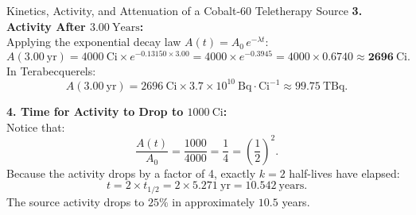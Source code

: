 \begin{workedexample}{Kinetics, Activity, and Attenuation of a Cobalt-60 Teletherapy Source}
\textbf{3. Activity After $3.00\ \mathrm{Years}$:}\\
Applying the exponential decay law $A(t) = A_0\,e^{-\lambda t}$:
\[
A(3.00\ \mathrm{yr}) = 4000\ \mathrm{Ci} \times e^{-0.13150 \times 3.00} = 4000 \times e^{-0.3945} = 4000 \times 0.6740 \approx \mathbf{2696\ \mathrm{Ci}}.
\]
In Terabecquerels:
\[
A(3.00\ \mathrm{yr}) = 2696\ \mathrm{Ci} \times 3.7 \times 10^{10}\ \mathrm{Bq\cdot Ci^{-1}} \approx \mathbf{99.75\ \mathrm{TBq}}.
\]

\textbf{4. Time for Activity to Drop to $1000\ \mathrm{Ci}$:}\\
Notice that:
\[
\frac{A(t)}{A_0} = \frac{1000}{4000} = \frac{1}{4} = \left(\frac{1}{2}\right)^2.
\]
Because the activity drops by a factor of 4, exactly $k = 2$ half-lives have elapsed:
\[
t = 2 \times t_{1/2} = 2 \times 5.271\ \mathrm{yr} = \mathbf{10.542\ \mathrm{years}}.
\]
The source activity drops to $25\%$ in approximately $10.5$ years.
\end{workedexample}

